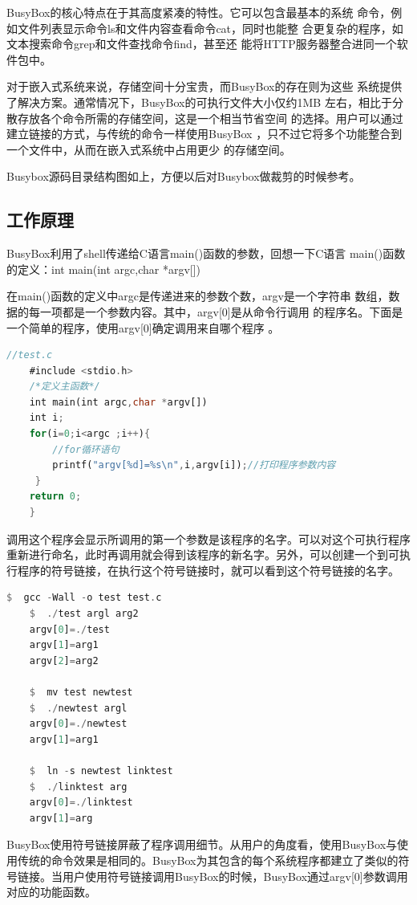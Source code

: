 BusyBox的核心特点在于其高度紧凑的特性。它可以包含最基本的系统
命令，例如文件列表显示命令ls和文件内容查看命令cat，同时也能整
合更复杂的程序，如文本搜索命令grep和文件查找命令find，甚至还
能将HTTP服务器整合进同一个软件包中。

对于嵌入式系统来说，存储空间十分宝贵，而BusyBox的存在则为这些
系统提供了解决方案。通常情况下，BusyBox的可执行文件大小仅约1MB
左右，相比于分散存放各个命令所需的存储空间，这是一个相当节省空间
的选择。用户可以通过建立链接的方式，与传统的命令一样使用BusyBox
，只不过它将多个功能整合到一个文件中，从而在嵌入式系统中占用更少
的存储空间。

Busybox源码目录结构图如上，方便以后对Busybox做裁剪的时候参考。

\subsection{工作原理}
BusyBox利用了shell传递给C语言main()函数的参数，回想一下C语言
main()函数的定义：int main(int argc,char *argv[])

在main()函数的定义中argc是传递进来的参数个数，argv是一个字符串
数组，数据的每一项都是一个参数内容。其中，argv[0]是从命令行调用
的程序名。下面是一个简单的程序，使用argv[0]确定调用来自哪个程序
。

\begin{lstlisting}[language=Rust]
	//test.c
	#include <stdio.h>
	/*定义主函数*/
	int main(int argc,char *argv[])
	int i;
	for(i=0;i<argc ;i++){
		//for循环语句
		printf("argv[%d]=%s\n",i,argv[i]);//打印程序参数内容
	 }
	return 0;
    }
\end{lstlisting}

调用这个程序会显示所调用的第一个参数是该程序的名字。可以对这个可执行程序重新进行命名，此时再调用就会得到该程序的新名字。另外，可以创建一个到可执行程序的符号链接，在执行这个符号链接时，就可以看到这个符号链接的名字。

\begin{lstlisting}[language=Rust]
	$  gcc -Wall -o test test.c
	$  ./test argl arg2
	argv[0]=./test
	argv[1]=arg1
	argv[2]=arg2

	$  mv test newtest
	$  ./newtest argl
	argv[0]=./newtest
	argv[1]=arg1

	$  ln -s newtest linktest
	$  ./linktest arg
	argv[0]=./linktest
	argv[1]=arg
	\end{lstlisting}

BusyBox使用符号链接屏蔽了程序调用细节。从用户的角度看，使用BusyBox与使用传统的命令效果是相同的。BusyBox为其包含的每个系统程序都建立了类似的符号链接。当用户使用符号链接调用BusyBox的时候，BusyBox通过argv[0]参数调用对应的功能函数。

